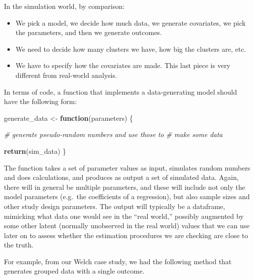 \documentclass[
]{book}
\newenvironment{Shaded}{\begin{snugshade}}{\end{snugshade}}
\newcommand{\CommentTok}[1]{\textcolor[rgb]{0.56,0.35,0.01}{\textit{#1}}}
\newcommand{\ControlFlowTok}[1]{\textcolor[rgb]{0.13,0.29,0.53}{\textbf{#1}}}
\newcommand{\FunctionTok}[1]{\textcolor[rgb]{0.13,0.29,0.53}{\textbf{#1}}}
\newcommand{\NormalTok}[1]{#1}
\newcommand{\OtherTok}[1]{\textcolor[rgb]{0.56,0.35,0.01}{#1}}
\providecommand{\tightlist}{%
  \setlength{\itemsep}{0pt}\setlength{\parskip}{0pt}}
\begin{document}
In the simulation world, by comparison:

\begin{itemize}
\tightlist
\item
  We pick a model, we decide how much data, we generate covariates, we pick the parameters, and then we generate outcomes.
\item
  We need to decide how many clusters we have, how big the clusters are, etc.
\item
  We have to specify how the covariates are made. This last piece is very different from real-world analysis.
\end{itemize}

In terms of code, a function that implements a data-generating model should have the following form:

\begin{Shaded}
\begin{Highlighting}[]
\NormalTok{generate\_data }\OtherTok{\textless{}{-}} \ControlFlowTok{function}\NormalTok{(parameters) \{}
  
  \CommentTok{\# generate pseudo{-}random numbers and use those to}
  \CommentTok{\# make some data}
  
  \FunctionTok{return}\NormalTok{(sim\_data)}
\NormalTok{\}}
\end{Highlighting}
\end{Shaded}

The function takes a set of parameter values as input, simulates random numbers and does calculations, and produces as output a set of simulated data.
Again, there will in general be multiple parameters, and these will include not only the model parameters (e.g.~the coefficients of a regression), but also sample sizes and other study design parameters.
The output will typically be a dataframe, mimicking what data one would see in the ``real world,'' possibly augmented by some other latent (normally unobserved in the real world) values that we can use later on to assess whether the estimation procedures we are checking are close to the truth.

For example, from our Welch case study, we had the following method that generates grouped data with a single outcome.
\end{document}
